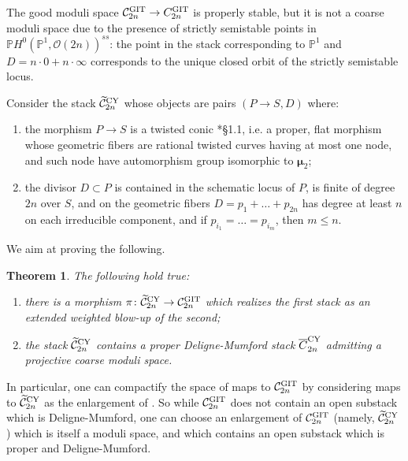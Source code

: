 \documentclass{amsart}
\newcommand{\bP}{\mathbb{P}}
\newcommand{\cC}{\mathcal{C}}
\newcommand{\cO}{\mathcal{O}}
\newcommand{\bmu}{\bm{\mu}}
\newcommand{\Ctilde}{\widetilde{\mathcal{C}}}
\newcommand{\git}{{\rm GIT}}
\newcommand{\CY}{{\rm CY}}
\newtheorem{Teo}[theorem]{Theorem}
\theoremstyle{definition}
\theoremstyle{definition}
\begin{document}
{The good moduli space $\cC_{2n}^{\git}\to C_{2n}^{\git}$ is properly stable, but it is not a coarse moduli space due to the presence of strictly semistable points in $\bP H^0(\bP^1,\cO(2n))^{ss}$: the point in the stack corresponding to $\bP^1$ and $D=n\cdot 0 + n\cdot \infty$ corresponds to the unique closed orbit of the strictly semistable locus.

Consider the stack $\Ctilde_{2n}^{\CY}$ whose objects are pairs $(P\to S, D)$ where:
\begin{enumerate}
    \item the morphism $P\to S$ is a twisted conic \cite{DLV}*{\S 1.1}, i.e. a proper, flat morphism whose geometric fibers are rational twisted curves having at most one node, and such node have automorphism group isomorphic to $\bmu_2$;
    \item the divisor $D\subset P$ is contained in the schematic locus of $P$, is finite of degree $2n$ over $S$, and on the geometric fibers $D=p_1+
    \ldots +p_{2n}$ has degree at least $n$ on each irreducible component, and if $p_{i_1}=\ldots =p_{i_m}$, then $m\leq n$.
\end{enumerate}
We aim at proving the following.
\begin{Teo}\label{thm:CY extended blow up}
    The following hold true:
    \begin{enumerate}
        \item there is a morphism $\pi\colon \Ctilde^{\CY}_{2n}\to\cC^{\git}_{2n}$ which realizes the first stack as an extended weighted blow-up of the second;
        \item the stack $\Ctilde^{\CY}_{2n}$ contains a proper Deligne-Mumford stack $\overline{C}_{2n}^{\CY}$ admitting a projective coarse moduli space.
    \end{enumerate}
\end{Teo}
In particular, one can compactify the space of maps to $\cC_{2n}^\git$ by considering maps to $\Ctilde^{\CY}_{2n}$ as the enlargement of .
So while $\cC_{2n}^\git$ does not contain an open
substack which is Deligne-Mumford, one can choose an enlargement of $\cC_{2n}^\git$ 
(namely, $\Ctilde^{\CY}_{2n}$) which is itself a moduli space, and which contains an open substack which is proper and Deligne-Mumford.

}
\end{document}
